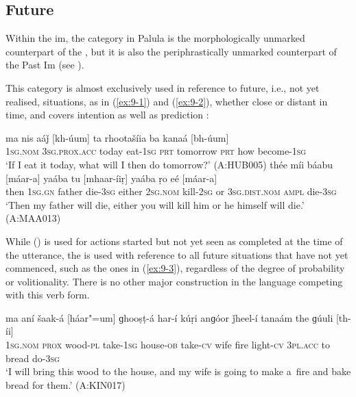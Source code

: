 \subsection{Future}
\label{subsec:9-1-2}


Within the im, the  category in Palula is the morphologically unmarked counterpart of the , but it is also the periphrastically unmarked counterpart of the Past Im (see ). 



This category is almost exclusively used in reference to future, i.e., not yet realised, situations, as in (\ref{ex:9-1}) and (\ref{ex:9-2}), whether close or distant in time, and covers intention as well as prediction \citep[105--108]{dahl1985}:


\begin{exe}
\ex
\label{ex:9-1}
\gll ma nis aáǰ [kh-úum] ta rhootašíia ba kanaá [bh-úum]  \\
\textsc{1sg.nom} \textsc{3}\textsc{sg.prox.acc} today eat-\textsc{1sg} \textsc{prt} tomorrow  \textsc{prt} how become-\textsc{1sg}\\
\glt `If I eat it today, what will I then do tomorrow?' (A:HUB005)
\ex
\label{ex:9-2}
\gll thée míi báabu [máar-a] yaába tu [mhaar-íiṛ] yaába ṛo eé [máar-a] \\
then \textsc{1sg.gn} father die-\textsc{3sg} either \textsc{2sg.nom} kill-\textsc{2sg}  or \textsc{3sg.dist.nom} \textsc{ampl} die-\textsc{3sg}  \\
\glt `Then my father will die, either you will kill him or he himself will die.' (A:MAA013)
\end{exe}

While  () is used for actions started but not yet seen as completed at the time of the utterance, the  is used with reference to all future situations that have not yet commenced, such as the ones in (\ref{ex:9-3}), regardless of the degree of probability or volitionality. There is no other major construction in the language competing with this verb form.

\begin{exe}
\ex
\label{ex:9-3}
\gll ma aní šaak-á [háar"=um] ɡhooṣṭ-á har-í kúṛi anɡóor ǰheel-í tanaám the ɡúuli [th-íi] \\
\textsc{1sg.nom} \textsc{prox} wood-\textsc{pl} take-\textsc{1sg} house-\textsc{ob} take-\textsc{cv}  wife fire light-\textsc{cv } \textsc{3pl.acc} to bread do-\textsc{3sg} \\
\glt `I will bring this wood to the house, and my wife is going to make a~fire and bake bread for
them.' (A:KIN017)
\end{exe}

